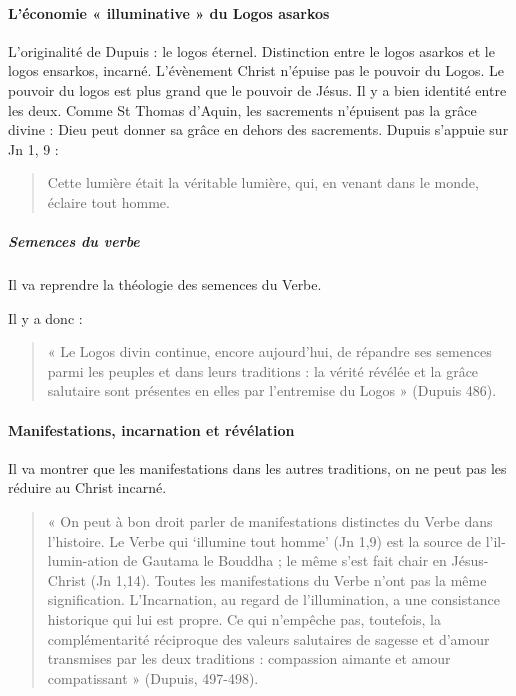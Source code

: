 \paragraph{L’économie « illuminative » du  Logos asarkos} L’originalité de Dupuis : le logos éternel. Distinction entre le logos asarkos et le logos ensarkos, incarné. L’évènement Christ n’épuise pas le pouvoir du Logos. Le pouvoir du logos est plus grand que le pouvoir de Jésus. Il y a bien identité entre les deux. Comme St Thomas d’Aquin, les sacrements n’épuisent pas la grâce divine : Dieu peut donner sa grâce en dehors des sacrements. Dupuis s’appuie sur Jn 1, 9 : 
\begin{quote}
    Cette  lumière était la véritable lumière, qui, en venant dans le monde, éclaire tout homme.
\end{quote}

\subparagraph{Semences du verbe} Il va reprendre la théologie des semences du Verbe. 

Il y a donc : 
\begin{quote}
    « Le Logos divin continue, encore aujourd’hui, de répandre ses semences parmi les peuples et dans leurs traditions : la vérité révélée et la grâce salutaire sont présentes en elles par l’entremise du Logos » (Dupuis 486).
\end{quote}


\paragraph{ Manifestations, incarnation et révélation }
Il va montrer que les manifestations dans les autres traditions, on ne peut pas les réduire au Christ incarné.
\begin{quote}
    « On peut à bon droit parler de manifestations distinctes du Verbe dans l’histoire. Le Verbe qui ‘illumine tout homme’ (Jn 1,9) est la source de l’il-lumin-ation de Gautama le Bouddha ; le même s’est fait chair en Jésus-Christ (Jn 1,14). Toutes les manifestations du Verbe n’ont pas la même signification. L’Incarnation, au regard de l’illumination, a une consistance historique qui lui est propre. Ce qui n’empêche pas, toutefois, la complémentarité réciproque des valeurs salutaires de sagesse et d’amour transmises par les deux traditions : compassion aimante et amour compatissant » (Dupuis, 497-498).
\end{quote}

